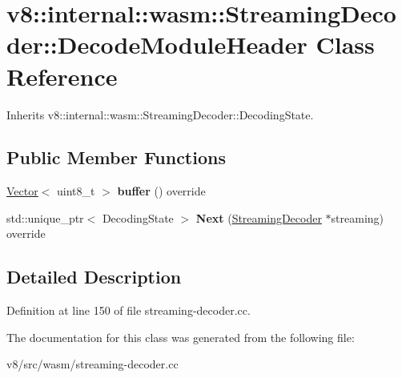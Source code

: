 \hypertarget{classv8_1_1internal_1_1wasm_1_1StreamingDecoder_1_1DecodeModuleHeader}{}\section{v8\+:\+:internal\+:\+:wasm\+:\+:Streaming\+Decoder\+:\+:Decode\+Module\+Header Class Reference}
\label{classv8_1_1internal_1_1wasm_1_1StreamingDecoder_1_1DecodeModuleHeader}


Inherits v8\+::internal\+::wasm\+::\+Streaming\+Decoder\+::\+Decoding\+State.

\subsection*{Public Member Functions}
\begin{DoxyCompactItemize}
\item 
\mbox{\label{classv8_1_1internal_1_1wasm_1_1StreamingDecoder_1_1DecodeModuleHeader_a2d7f5810d45c098ef6146e5d45026dba}} 
\mbox{\hyperlink{classv8_1_1internal_1_1Vector}{Vector}}$<$ uint8\+\_\+t $>$ {\bfseries buffer} () override
\item 
\mbox{\label{classv8_1_1internal_1_1wasm_1_1StreamingDecoder_1_1DecodeModuleHeader_a0374622e2d888f008bb691a29624a194}} 
std\+::unique\+\_\+ptr$<$ Decoding\+State $>$ {\bfseries Next} (\mbox{\hyperlink{classv8_1_1internal_1_1wasm_1_1StreamingDecoder}{Streaming\+Decoder}} $\ast$streaming) override
\end{DoxyCompactItemize}


\subsection{Detailed Description}


Definition at line 150 of file streaming-\/decoder.\+cc.



The documentation for this class was generated from the following file\+:\begin{DoxyCompactItemize}
\item 
v8/src/wasm/streaming-\/decoder.\+cc\end{DoxyCompactItemize}
